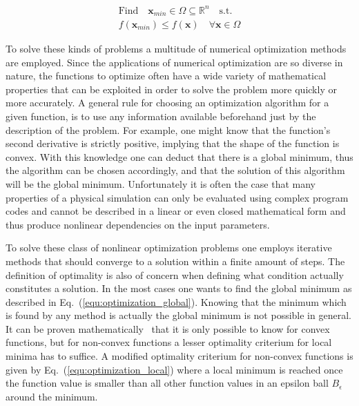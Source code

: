 \documentclass[a4paper,10pt]{article}
\renewcommand{\vec}[1]{\mathbf{#1}}
\newcommand{\equref}[1]{Eq.~(\ref{#1})}
\begin{document}
    \begin{equation}
        \label{equ:optimization_global}
        \begin{gathered}
        \text{Find} \quad \vec{x}_{min} \in \Omega \subseteq \mathbb{R}^n \quad \text{s.t.}\\
        f(\vec{x}_{min}) \leq f(\vec{x}) \quad \forall \vec{x} \in \Omega
        \end{gathered} 
    \end{equation}

    To solve these kinds of problems a multitude of numerical
    optimization methods are employed.
    Since the applications of numerical optimization are so diverse
    in nature, the functions to optimize often have a wide variety
    of mathematical properties that can be exploited in order to solve
    the problem more quickly or more accurately.
    A general rule for choosing an optimization algorithm for a given
    function, is to use any information available beforehand just by the
    description of the problem.
    For example, one might know that the function's second derivative is
    strictly positive, implying that the shape of the function is convex.
    With this knowledge one can deduct that there is a global minimum, 
    thus the algorithm can be chosen accordingly, and that the 
    solution of this algorithm will be the global minimum.
    Unfortunately it is often the case that many properties of a 
    physical simulation can only be evaluated using
    complex program codes and cannot be described in a linear or 
    even closed mathematical form and thus produce nonlinear
    dependencies on the input parameters.

    To solve these class of nonlinear optimization problems one employs
    iterative methods that should converge to a solution within a
    finite amount of steps.
    The definition of optimality is also of concern when defining
    what condition actually constitutes a solution.
    In the most cases one wants to find the global minimum as described
    in \equref{equ:optimization_global}.
    Knowing that the minimum which is found by any method is actually
    the global minimum is not possible in general.
    It can be proven mathematically~\cite{solomon_numerical} that it is only possible to know
    for convex functions, but for non-convex
    functions a lesser optimality criterium for local minima has to suffice.
    A modified optimality criterium for non-convex functions is given
    by \equref{equ:optimization_local} where a local minimum is reached
    once the function value is smaller than all other function values 
    in an epsilon ball $B_{\epsilon}$ around the minimum.
\end{document}
